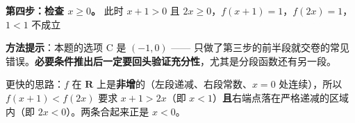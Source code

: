 \begin{answer}
\textbf{第四步：检查 $x\ge0$。} 此时 $x+1>0$ 且 $2x\ge0$，$f(x+1)=1$，$f(2x)=1$，$1<1$ 不成立 

\begin{gktip}
\textbf{方法提示}：本题的选项 C 是 $(-1,0)$ —— 只做了第三步的前半段就交卷的常见错误。\textbf{必要条件推出后一定要回头验证充分性}，尤其是分段函数还有另一段。

更快的思路：$f$ 在 $\mathbf R$ 上是\textbf{非增}的（左段递减、右段常数、$x=0$ 处连续），所以 $f(x+1)<f(2x)$ 要求 $x+1>2x$（即 $x<1$）\textbf{且}右端点落在严格递减的区域内（即 $2x<0$）。两条合起来正是 $x<0$。
\end{gktip}


\par\medskip

\end{answer}

